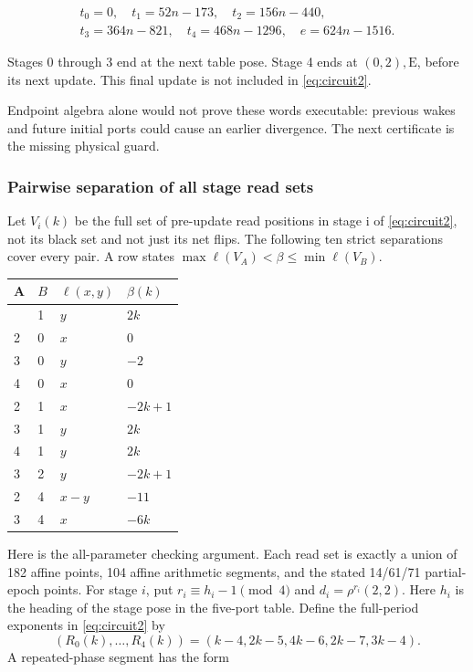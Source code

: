 \documentclass[
  11pt,
]{article}
\begin{document}
\begin{equation}\label{eq:circuit3}
\begin{gathered}t_0=0,\quad t_1=52n-173,\quad t_2=156n-440,\\t_3=364n-821,\quad t_4=468n-1296,\quad e=624n-1516.\end{gathered}
\end{equation}

Stages 0 through 3 end at the next table pose. Stage 4 ends at \((0,2),\mathrm E\),
before its next update. This final update is not included in \eqref{eq:circuit2}.

Endpoint algebra alone would not prove these words executable: previous
wakes and future initial ports could cause an earlier divergence. The
next certificate is the missing physical guard.

\subsubsection{Pairwise separation of all stage read
sets}\label{pairwise-separation-of-all-stage-read-sets}

Let $V_i(k)$ be the full set of pre-update read positions in stage i of
\eqref{eq:circuit2}, not its black set and not just its net flips. The following
ten strict separations cover every pair. A row states $\max\ell(V_A)<\beta\le\min\ell(V_B)$.

\begin{longtable}[]{@{}llll@{}}
\toprule\noalign{}
A & \(B\) & $\ell(x,y)$ & $\beta(k)$ \\
\midrule\noalign{}
\endhead
\bottomrule\noalign{}
\endlastfoot
0 & 1 & $y$ & $2k$ \\
2 & 0 & $x$ & $0$ \\
3 & 0 & $y$ & $-2$ \\
4 & 0 & $x$ & $0$ \\
2 & 1 & $x$ & $-2k+1$ \\
3 & 1 & $y$ & $2k$ \\
4 & 1 & $y$ & $2k$ \\
3 & 2 & $y$ & $-2k+1$ \\
2 & 4 & $x-y$ & $-11$ \\
3 & 4 & $x$ & $-6k$ \\
\end{longtable}

Here is the all-parameter checking argument. Each read set is exactly a
union of 182 affine points, 104 affine arithmetic segments, and the
stated 14/61/71 partial-epoch points. For stage \(i\), put
\(r_i\equiv h_i-1\pmod4\) and \(d_i=\rho^{r_i}(2,2)\). Here \(h_i\) is the
heading of the stage pose in the five-port table. Define the full-period
exponents in \eqref{eq:circuit2} by
\[
(R_0(k),\ldots,R_4(k))=(k-4,2k-5,4k-6,2k-7,3k-4).
\]
A repeated-phase segment has the form
\end{document}
